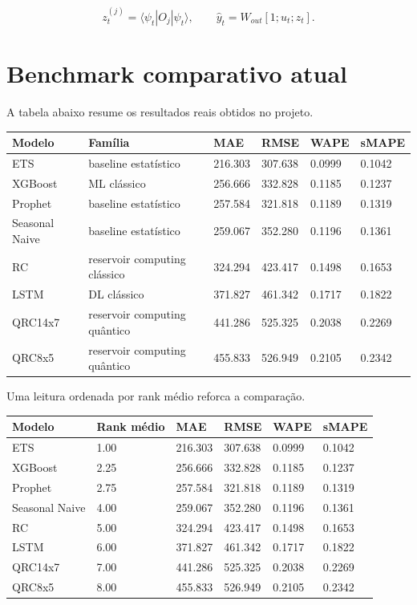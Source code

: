 \documentclass[12pt]{article}
\begin{document}
\[
z_t^{(j)} = \langle \psi_t | O_j | \psi_t \rangle,
\qquad
\hat{y}_t = W_{out} [1; u_t; z_t].
\]

\section{Benchmark comparativo atual}\label{5-benchmark-comparativo-atual}

A tabela abaixo resume os resultados reais obtidos no projeto.

\begin{longtable}[]{@{}llllll@{}}
\toprule\noalign{}
Modelo & Família & MAE & RMSE & WAPE & sMAPE \\
\midrule\noalign{}
\endhead
\bottomrule\noalign{}
\endlastfoot
ETS & baseline estatístico & 216.303 & 307.638 & 0.0999 & 0.1042 \\
XGBoost & ML clássico & 256.666 & 332.828 & 0.1185 & 0.1237 \\
Prophet & baseline estatístico & 257.584 & 321.818 & 0.1189 & 0.1319 \\
Seasonal Naive & baseline estatístico & 259.067 & 352.280 & 0.1196 & 0.1361 \\
RC & reservoir computing clássico & 324.294 & 423.417 & 0.1498 & 0.1653 \\
LSTM & DL clássico & 371.827 & 461.342 & 0.1717 & 0.1822 \\
QRC14x7 & reservoir computing quântico & 441.286 & 525.325 & 0.2038 & 0.2269 \\
QRC8x5 & reservoir computing quântico & 455.833 & 526.949 & 0.2105 & 0.2342 \\
\end{longtable}

Uma leitura ordenada por rank médio reforca a comparação.

\begin{longtable}[]{@{}llllll@{}}
\toprule\noalign{}
Modelo & Rank médio & MAE & RMSE & WAPE & sMAPE \\
\midrule\noalign{}
\endhead
\bottomrule\noalign{}
\endlastfoot
ETS & 1.00 & 216.303 & 307.638 & 0.0999 & 0.1042 \\
XGBoost & 2.25 & 256.666 & 332.828 & 0.1185 & 0.1237 \\
Prophet & 2.75 & 257.584 & 321.818 & 0.1189 & 0.1319 \\
Seasonal Naive & 4.00 & 259.067 & 352.280 & 0.1196 & 0.1361 \\
RC & 5.00 & 324.294 & 423.417 & 0.1498 & 0.1653 \\
LSTM & 6.00 & 371.827 & 461.342 & 0.1717 & 0.1822 \\
QRC14x7 & 7.00 & 441.286 & 525.325 & 0.2038 & 0.2269 \\
QRC8x5 & 8.00 & 455.833 & 526.949 & 0.2105 & 0.2342 \\
\end{longtable}
\end{document}
